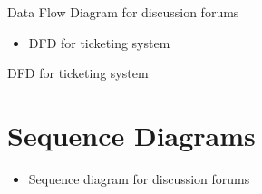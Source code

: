\documentclass[letterpaper,10pt,english]{sphinxmanual}
\begin{document}
Data Flow Diagram for discussion forums
\begin{itemize}
\item {} 
DFD for ticketing system

\end{itemize}
\begin{figure}[htbp]
\centering

\end{figure}

DFD for ticketing system


\section{Sequence Diagrams}
\label{unifieddoc:sequence-diagrams}\begin{itemize}
\item {} 
Sequence diagram for discussion forums

\end{itemize}
\begin{figure}[htbp]
\centering

\end{figure}
\end{document}
